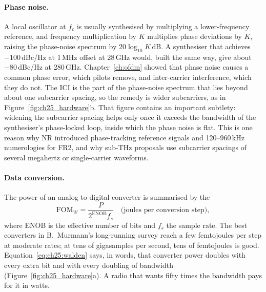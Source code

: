 
\paragraph{Phase noise.} A local oscillator at $f_c$ is usually synthesised by multiplying a
lower-frequency reference, and frequency multiplication by $K$ multiplies phase deviations by $K$,
raising the phase-noise spectrum by $20\log_{10}K$\,dB. A synthesiser that achieves
$-100$\,dBc/Hz at 1\,MHz offset at 28\,GHz would, built the same way, give about $-80$\,dBc/Hz at
280\,GHz. Chapter~\ref{ch:ofdm} showed that phase noise causes a common phase error, which pilots
remove, and inter-carrier interference, which they do not. The ICI is the part of the phase-noise
spectrum that lies beyond about one subcarrier spacing, so the remedy is wider subcarriers, as in
Figure~\ref{fig:ch25_hardware}b. That figure contains an important subtlety: widening the subcarrier
spacing helps only once it exceeds the bandwidth of the synthesiser's phase-locked loop, inside which
the phase noise is flat. This is one reason why NR introduced phase-tracking reference signals and
120--960\,kHz numerologies for FR2, and why sub-THz proposals use subcarrier spacings of several
megahertz or single-carrier waveforms.


\paragraph{Data conversion.} The power of an analog-to-digital converter is summarised by the
\begin{equation}
\mathrm{FOM}_W=\frac{P}{2^{\mathrm{ENOB}}f_s}\quad\text{(joules per conversion step)},
\label{eq:ch25:walden}
\end{equation}
where ENOB is the effective number of bits and $f_s$ the sample rate. The best converters in
B.~Murmann's long-running survey reach a few femtojoules per step at moderate rates; at tens of
gigasamples per second, tens of femtojoules is good. Equation~\eqref{eq:ch25:walden} says, in words,
that converter power doubles with every extra bit and with every doubling of bandwidth
(Figure~\ref{fig:ch25_hardware}a). A radio that wants fifty times the bandwidth pays for it in watts.

